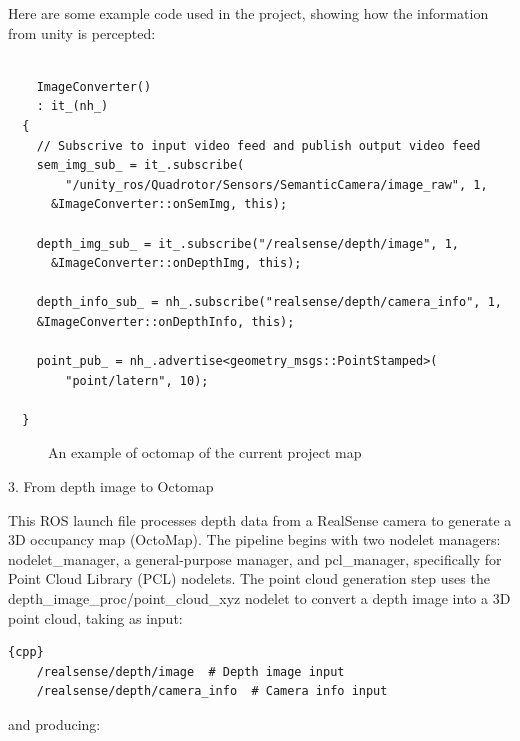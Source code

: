 \documentclass{article}
\begin{document}
Here are some example code used in the project, showing how the information from unity is percepted:
\begin{lstlisting}

    ImageConverter()
    : it_(nh_)
  {
    // Subscrive to input video feed and publish output video feed
    sem_img_sub_ = it_.subscribe(
        "/unity_ros/Quadrotor/Sensors/SemanticCamera/image_raw", 1,
      &ImageConverter::onSemImg, this);

    depth_img_sub_ = it_.subscribe("/realsense/depth/image", 1,
      &ImageConverter::onDepthImg, this);  

    depth_info_sub_ = nh_.subscribe("realsense/depth/camera_info", 1, 
    &ImageConverter::onDepthInfo, this);

    point_pub_ = nh_.advertise<geometry_msgs::PointStamped>(
        "point/latern", 10);

  }
\end{lstlisting}
\begin{figure}[h]
\centering
    \caption{An example of octomap of the current project map}
    \label{fig:GUI}
\end{figure}

3. From depth image to Octomap

This ROS launch file processes depth data from a RealSense camera to generate a 3D occupancy map (OctoMap). The pipeline begins with two nodelet managers: nodelet\_manager, a general-purpose manager, and pcl\_manager, specifically for Point Cloud Library (PCL) nodelets. The point cloud generation step uses the depth\_image\_proc/point\_cloud\_xyz nodelet to convert a depth image into a 3D point cloud, taking as input:

\begin{lstlisting}{cpp}
    /realsense/depth/image  # Depth image input
    /realsense/depth/camera_info  # Camera info input    
\end{lstlisting}
and producing:
\end{document}
